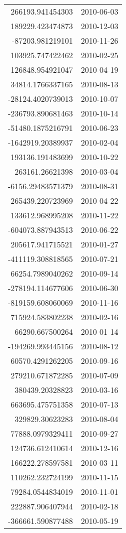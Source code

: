 \begin{tabular}{r | l}
266193.941454303 & 2010-06-03 \\
189229.423474873 & 2010-12-03 \\
-87203.981219101 & 2010-11-26 \\
103925.747422462 & 2010-02-25 \\
126848.954921047 & 2010-04-19 \\
34814.1766337165 & 2010-08-13 \\
-28124.4020739013 & 2010-10-07 \\
-236793.890681463 & 2010-10-14 \\
-51480.1875216791 & 2010-06-23 \\
-1642919.20389937 & 2010-02-04 \\
193136.191483699 & 2010-10-22 \\
263161.26621398 & 2010-03-04 \\
-6156.29483571379 & 2010-08-31 \\
265439.220723969 & 2010-04-22 \\
133612.968995208 & 2010-11-22 \\
-604073.887943513 & 2010-06-22 \\
205617.941715521 & 2010-01-27 \\
-411119.308818565 & 2010-07-21 \\
66254.7989040262 & 2010-09-14 \\
-278194.114677606 & 2010-06-30 \\
-819159.608060069 & 2010-11-16 \\
715924.583802238 & 2010-02-16 \\
66290.667500264 & 2010-01-14 \\
-194269.993445156 & 2010-08-12 \\
60570.4291262205 & 2010-09-16 \\
279210.671872285 & 2010-07-09 \\
380439.20328823 & 2010-03-16 \\
663695.475751358 & 2010-07-13 \\
329829.30623283 & 2010-08-04 \\
77888.0979329411 & 2010-09-27 \\
124736.612410614 & 2010-12-16 \\
166222.278597581 & 2010-03-11 \\
110262.232724199 & 2010-11-15 \\
79284.0544834019 & 2010-11-01 \\
222887.906407944 & 2010-02-18 \\
-366661.590877488 & 2010-05-19 \\

\end{tabular}
